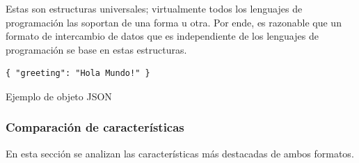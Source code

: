 Estas son estructuras universales; virtualmente todos los lenguajes de programación las soportan de una forma u otra. Por ende, es razonable que un formato de intercambio de datos que es independiente de los lenguajes de programación se base en estas estructuras.

\begin{verbatim}
{ "greeting": "Hola Mundo!" } 
\end{verbatim}
\begin{center}
\caption{Ejemplo de objeto JSON}
\end{center}

\subsubsection{Comparación de características}
En esta sección se analizan las características más destacadas de ambos formatos.

